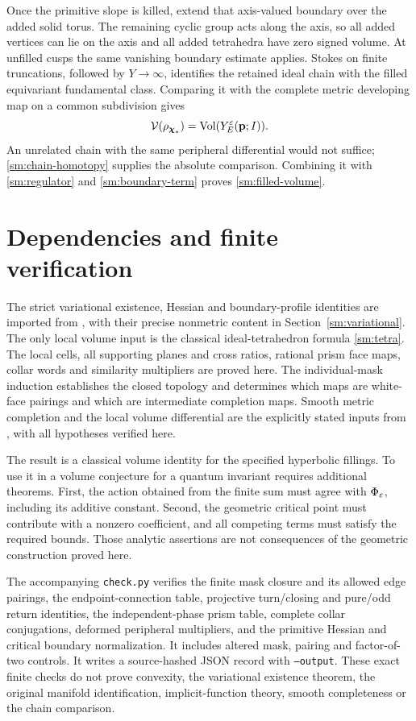 Once the primitive slope is killed, extend that axis-valued boundary
over the added solid torus. The remaining cyclic group acts along
the axis, so all added vertices can lie on the axis and all added
tetrahedra have zero signed volume. At unfilled cusps the same
vanishing boundary estimate applies. Stokes on finite truncations,
followed by $Y\to\infty$, identifies the retained ideal chain with
the filled equivariant fundamental class. Comparing it with the
complete metric developing map on a common subdivision gives
\[
                 \mathcal V(\rho_{\boldsymbol\chi_*})
                        =\operatorname{Vol}(Y_E^\varepsilon(\mathbf p;I)).
\]
An unrelated chain with the same peripheral differential would not
suffice; \eqref{sm:chain-homotopy} supplies the absolute comparison.
Combining it with \eqref{sm:regulator} and
\eqref{sm:boundary-term} proves \eqref{sm:filled-volume}.

\section{Dependencies and finite verification}\label{sm:scope}

The strict variational existence, Hessian and boundary-profile
identities are imported from \cite{Newton}, with their precise
nonmetric content in Section~\ref{sm:variational}. The only local
volume input is the classical ideal-tetrahedron formula
\eqref{sm:tetra}. The local cells, all supporting planes and
cross ratios, rational prism face maps, collar words and
similarity multipliers are proved here. The individual-mask
induction establishes the closed topology and determines which
maps are white-face pairings and which are intermediate
completion maps.
Smooth metric completion and the local
volume differential are the explicitly stated inputs from
\cite{Marked}, with all hypotheses verified here.

The result is a classical volume identity for the specified
hyperbolic fillings. To use it in a volume conjecture for a quantum
invariant requires additional theorems. First, the action obtained from
the finite sum must agree with $\Phi_\varepsilon$, including its additive
constant. Second, the geometric critical point must contribute with a
nonzero coefficient, and all competing terms must satisfy the required
bounds. Those analytic assertions are not consequences of the geometric
construction proved here.

The accompanying \texttt{check.py} verifies the finite mask closure
and its allowed edge pairings, the endpoint-connection
table, projective turn/closing and pure/odd return identities,
the independent-phase prism table, complete collar conjugations,
deformed peripheral multipliers, and the primitive Hessian and
critical boundary normalization.
It includes altered mask, pairing and factor-of-two controls.
It writes a source-hashed JSON record with \texttt{--output}.
These exact finite checks do not prove convexity, the variational
existence theorem, the original manifold identification,
implicit-function theory, smooth completeness or the chain
comparison.

